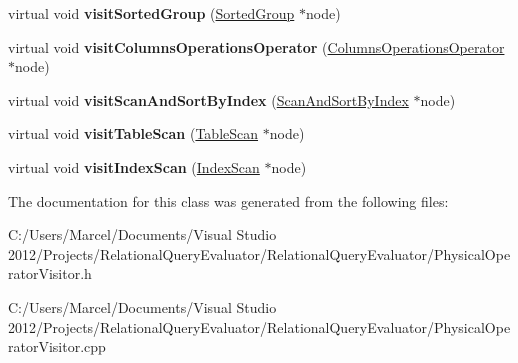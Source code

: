 \begin{DoxyCompactItemize}
\item 
\hypertarget{class_physical_operator_visitor_a3a3499a62341acf3e49f34ee02a8ed61}{virtual void {\bfseries visit\+Sorted\+Group} (\hyperlink{class_sorted_group}{Sorted\+Group} $\ast$node)}\label{class_physical_operator_visitor_a3a3499a62341acf3e49f34ee02a8ed61}

\item 
\hypertarget{class_physical_operator_visitor_a8c3a41665c8f7ce941532ad9d2052a14}{virtual void {\bfseries visit\+Columns\+Operations\+Operator} (\hyperlink{class_columns_operations_operator}{Columns\+Operations\+Operator} $\ast$node)}\label{class_physical_operator_visitor_a8c3a41665c8f7ce941532ad9d2052a14}

\item 
\hypertarget{class_physical_operator_visitor_ad5551e62c8b00b676577ac6b046be696}{virtual void {\bfseries visit\+Scan\+And\+Sort\+By\+Index} (\hyperlink{class_scan_and_sort_by_index}{Scan\+And\+Sort\+By\+Index} $\ast$node)}\label{class_physical_operator_visitor_ad5551e62c8b00b676577ac6b046be696}

\item 
\hypertarget{class_physical_operator_visitor_a62063b4a4740e730ef7f6728dd926d52}{virtual void {\bfseries visit\+Table\+Scan} (\hyperlink{class_table_scan}{Table\+Scan} $\ast$node)}\label{class_physical_operator_visitor_a62063b4a4740e730ef7f6728dd926d52}

\item 
\hypertarget{class_physical_operator_visitor_ae32578d3229a00be39229a86b575c599}{virtual void {\bfseries visit\+Index\+Scan} (\hyperlink{class_index_scan}{Index\+Scan} $\ast$node)}\label{class_physical_operator_visitor_ae32578d3229a00be39229a86b575c599}

\end{DoxyCompactItemize}


The documentation for this class was generated from the following files\+:\begin{DoxyCompactItemize}
\item 
C\+:/\+Users/\+Marcel/\+Documents/\+Visual Studio 2012/\+Projects/\+Relational\+Query\+Evaluator/\+Relational\+Query\+Evaluator/Physical\+Operator\+Visitor.\+h\item 
C\+:/\+Users/\+Marcel/\+Documents/\+Visual Studio 2012/\+Projects/\+Relational\+Query\+Evaluator/\+Relational\+Query\+Evaluator/Physical\+Operator\+Visitor.\+cpp\end{DoxyCompactItemize}
